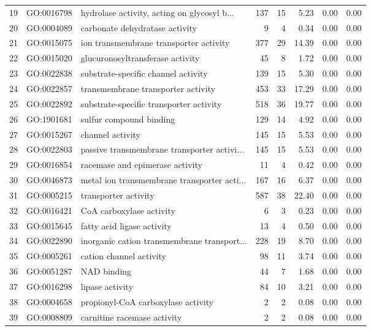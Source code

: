 \begin{table}[ht]
\begin{tabular}{rllrrrrr}
  19 & GO:0016798 & hydrolase activity, acting on glycosyl b... & 137 &  15 & 5.23 & 0.00 & 0.00 \\ 
  20 & GO:0004089 & carbonate dehydratase activity &   9 &   4 & 0.34 & 0.00 & 0.00 \\ 
  21 & GO:0015075 & ion transmembrane transporter activity & 377 &  29 & 14.39 & 0.00 & 0.00 \\ 
  22 & GO:0015020 & glucuronosyltransferase activity &  45 &   8 & 1.72 & 0.00 & 0.00 \\ 
  23 & GO:0022838 & substrate-specific channel activity & 139 &  15 & 5.30 & 0.00 & 0.00 \\ 
  24 & GO:0022857 & transmembrane transporter activity & 453 &  33 & 17.29 & 0.00 & 0.00 \\ 
  25 & GO:0022892 & substrate-specific transporter activity & 518 &  36 & 19.77 & 0.00 & 0.00 \\ 
  26 & GO:1901681 & sulfur compound binding & 129 &  14 & 4.92 & 0.00 & 0.00 \\ 
  27 & GO:0015267 & channel activity & 145 &  15 & 5.53 & 0.00 & 0.00 \\ 
  28 & GO:0022803 & passive transmembrane transporter activi... & 145 &  15 & 5.53 & 0.00 & 0.00 \\ 
  29 & GO:0016854 & racemase and epimerase activity &  11 &   4 & 0.42 & 0.00 & 0.00 \\ 
  30 & GO:0046873 & metal ion transmembrane transporter acti... & 167 &  16 & 6.37 & 0.00 & 0.00 \\ 
  31 & GO:0005215 & transporter activity & 587 &  38 & 22.40 & 0.00 & 0.00 \\ 
  32 & GO:0016421 & CoA carboxylase activity &   6 &   3 & 0.23 & 0.00 & 0.00 \\ 
  33 & GO:0015645 & fatty acid ligase activity &  13 &   4 & 0.50 & 0.00 & 0.00 \\ 
  34 & GO:0022890 & inorganic cation transmembrane transport... & 228 &  19 & 8.70 & 0.00 & 0.00 \\ 
  35 & GO:0005261 & cation channel activity &  98 &  11 & 3.74 & 0.00 & 0.00 \\ 
  36 & GO:0051287 & NAD binding &  44 &   7 & 1.68 & 0.00 & 0.00 \\ 
  37 & GO:0016298 & lipase activity &  84 &  10 & 3.21 & 0.00 & 0.00 \\ 
  38 & GO:0004658 & propionyl-CoA carboxylase activity &   2 &   2 & 0.08 & 0.00 & 0.00 \\ 
  39 & GO:0008809 & carnitine racemase activity &   2 &   2 & 0.08 & 0.00 & 0.00 \\ 

\end{tabular}
\end{table}
